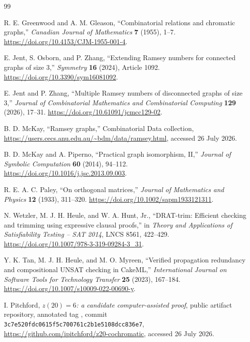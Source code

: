 \documentclass[11pt,a4paper]{article}
\theoremstyle{definition}
\theoremstyle{remark}
\newcommand{\sha}[1]{\texttt{\footnotesize #1}}
\newcommand{\artifact}[1]{\texttt{\detokenize{#1}}}
\begin{document}
\small\raggedright
\begin{thebibliography}{99}

R. E. Greenwood and A. M. Gleason,
``Combinatorial relations and chromatic graphs,''
\emph{Canadian Journal of Mathematics} \textbf{7} (1955), 1--7.
\url{https://doi.org/10.4153/CJM-1955-001-4}.

E. Jent, S. Osborn, and P. Zhang,
``Extending Ramsey numbers for connected graphs of size 3,''
\emph{Symmetry} \textbf{16} (2024), Article 1092.
\url{https://doi.org/10.3390/sym16081092}.

E. Jent and P. Zhang,
``Multiple Ramsey numbers of disconnected graphs of size 3,''
\emph{Journal of Combinatorial Mathematics and Combinatorial Computing}
\textbf{129} (2026), 17--31.
\url{https://doi.org/10.61091/jcmcc129-02}.

B. D. McKay,
``Ramsey graphs,'' Combinatorial Data collection,
\url{https://users.cecs.anu.edu.au/~bdm/data/ramsey.html},
accessed 26 July 2026.

B. D. McKay and A. Piperno,
``Practical graph isomorphism, II,''
\emph{Journal of Symbolic Computation} \textbf{60} (2014), 94--112.
\url{https://doi.org/10.1016/j.jsc.2013.09.003}.

R. E. A. C. Paley,
``On orthogonal matrices,''
\emph{Journal of Mathematics and Physics} \textbf{12} (1933), 311--320.
\url{https://doi.org/10.1002/sapm1933121311}.

N. Wetzler, M. J. H. Heule, and W. A. Hunt, Jr.,
``DRAT-trim: Efficient checking and trimming using expressive clausal
proofs,'' in \emph{Theory and Applications of Satisfiability Testing --
SAT 2014}, LNCS 8561, 422--429.
\url{https://doi.org/10.1007/978-3-319-09284-3_31}.

Y. K. Tan, M. J. H. Heule, and M. O. Myreen,
``Verified propagation redundancy and compositional UNSAT checking in
CakeML,''
\emph{International Journal on Software Tools for Technology Transfer}
\textbf{25} (2023), 167--184.
\url{https://doi.org/10.1007/s10009-022-00690-y}.

I. Pitchford,
\emph{\(z(20)=6\): a candidate computer-assisted proof},
public artifact repository, annotated tag
\artifact{candidate-2026-07-26}, commit
\sha{3c7e520fdc0615f5c700761c2b1e5108dcc836e7},
\url{https://github.com/ipitchford/z20-cochromatic},
accessed 26 July 2026.

\end{thebibliography}
\normalsize
\end{document}
